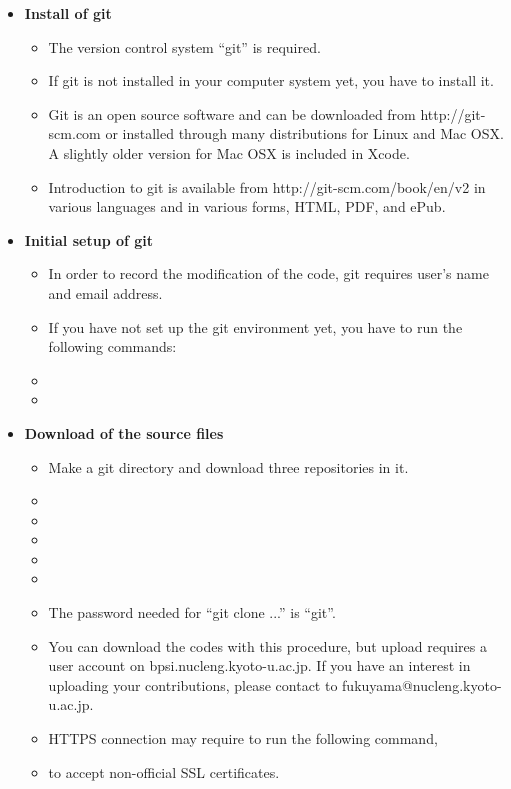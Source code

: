 \documentclass[11pt]{article}
\begin{document}
\begin{itemize}
\item
\textbf{Install of git}
\begin{itemize}
\item
The version control system ``git'' is required.
\item
If git is not installed in your computer system yet, you have to install
it.
\item
Git is an open source software and can be downloaded from
http://git-scm.com or installed through many distributions for Linux
and Mac OSX. A slightly older version for Mac OSX is included in
Xcode.
\item
Introduction to git is available from http://git-scm.com/book/en/v2 in
various languages and in various forms, HTML, PDF, and ePub.
\end{itemize}
\item
\textbf{Initial setup of git}
\begin{itemize}
\item
In order to record the modification of the code, git requires user's
name and email address.
\item
If you have not set up the git environment yet, you have to run the
following commands:
\item[\qquad]
\item[\qquad]
\end{itemize}

\item
\textbf{Download of the source files}
\begin{itemize}
\item
Make a git directory  and download three repositories in it.

\item[\qquad]
\item[\qquad]
\item[\qquad]
\item[\qquad]
\item[\qquad]

\item
The password needed for ``git clone ...'' is ``git''.
\item
You can download the codes with this procedure, but upload requires a
user account on bpsi.nucleng.kyoto-u.ac.jp. If you have an interest in
uploading your contributions, please contact to fukuyama@nucleng.kyoto-u.ac.jp.
\item
HTTPS connection may require to run the following command,

\item[\qquad]

to accept non-official SSL certificates.
\end{itemize}
\end{itemize}
\end{document}
